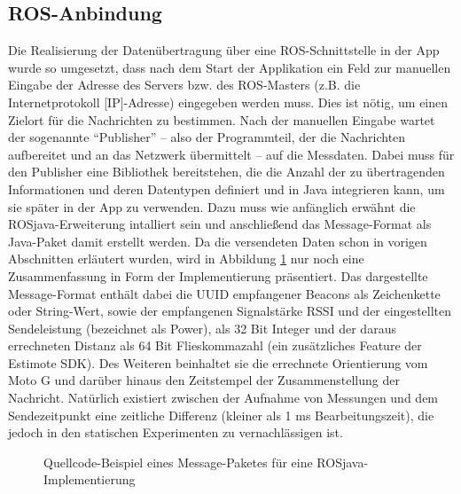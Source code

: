 \subsection{ROS-Anbindung}
Die Realisierung der Datenübertragung über eine ROS-Schnittstelle in der App wurde so umgesetzt, dass nach dem Start der Applikation ein Feld zur manuellen Eingabe der Adresse des Servers bzw. des ROS-Masters (z.B. die Internetprotokoll [IP]-Adresse) eingegeben werden muss. Dies ist nötig, um einen Zielort für die Nachrichten zu bestimmen. Nach der manuellen Eingabe wartet der sogenannte "`Publisher"' -- also der Programmteil, der die Nachrichten aufbereitet und an das Netzwerk übermittelt -- auf die Messdaten. Dabei muss für den Publisher eine Bibliothek bereitstehen, die die Anzahl der zu übertragenden Informationen und deren Datentypen definiert und in Java integrieren kann, um sie später in der App zu verwenden. Dazu muss wie anfänglich erwähnt die ROSjava-Erweiterung intalliert sein und anschließend das Message-Format als Java-Paket damit erstellt werden. Da die versendeten Daten schon in vorigen Abschnitten erläutert wurden, wird in Abbildung \ref{fig:ROSjavaImpl} nur noch eine Zusammenfassung in Form der Implementierung präsentiert. Das dargestellte Message-Format enthält dabei die UUID empfangener Beacons als Zeichenkette oder String-Wert, sowie der empfangenen Signalstärke RSSI und der eingestellten Sendeleistung (bezeichnet als Power), als 32 Bit Integer und der daraus errechneten Distanz als 64 Bit Flieskommazahl (ein zusätzliches Feature der Estimote SDK). Des Weiteren beinhaltet sie die errechnete Orientierung vom Moto G und darüber hinaus den Zeitstempel der Zusammenstellung der Nachricht. Natürlich existiert zwischen der Aufnahme von Messungen und dem Sendezeitpunkt eine zeitliche Differenz (kleiner als 1 ms Bearbeitungszeit), die jedoch in den statischen Experimenten zu vernachlässigen ist. 
\begin{figure}[H]
\centering
{}
\caption{Quellcode-Beispiel eines Message-Paketes für eine ROSjava-Implementierung}
\label{fig:ROSjavaImpl}
\end{figure}
